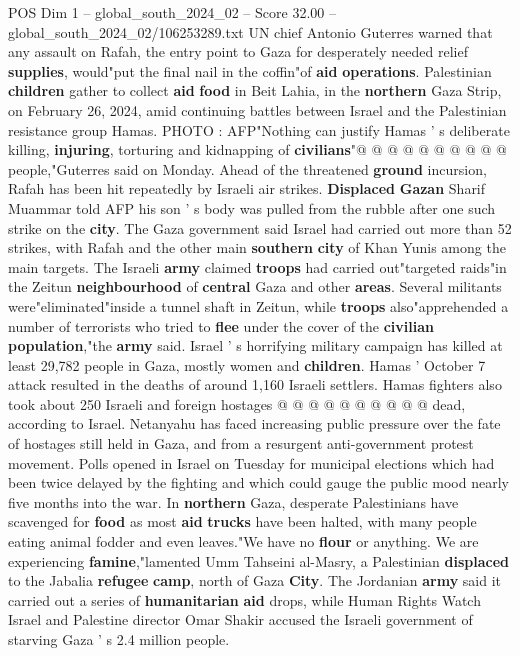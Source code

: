 \begin{textsample}{POS Dim 1 – global\_south\_2024\_02 – Score 32.00 – global\_south\_2024\_02/106253289.txt}
UN chief Antonio Guterres warned that any assault on Rafah, the entry point to Gaza for desperately needed relief \textbf{supplies}, would"put the final nail in the coffin"of \textbf{aid} \textbf{operations}.
Palestinian \textbf{children} gather to collect \textbf{aid} \textbf{food} in Beit Lahia, in the \textbf{northern} Gaza Strip, on February 26, 2024, amid continuing battles between Israel and the Palestinian resistance group Hamas.
PHOTO : AFP"Nothing can justify Hamas ' s deliberate killing, \textbf{injuring}, torturing and kidnapping of \textbf{civilians}"@ @ @ @ @ @ @ @ @ @ people,"Guterres said on Monday.
Ahead of the threatened \textbf{ground} incursion, Rafah has been hit repeatedly by Israeli air strikes. \textbf{Displaced} \textbf{Gazan} Sharif Muammar told AFP his son ' s body was pulled from the rubble after one such strike on the \textbf{city}.
The Gaza government said Israel had carried out more than 52 strikes, with Rafah and the other main \textbf{southern} \textbf{city} of Khan Yunis among the main targets.
The Israeli \textbf{army} claimed \textbf{troops} had carried out"targeted raids"in the Zeitun \textbf{neighbourhood} of \textbf{central} Gaza and other \textbf{areas}.
Several militants were"eliminated"inside a tunnel shaft in Zeitun, while \textbf{troops} also"apprehended a number of terrorists who tried to \textbf{flee} under the cover of the \textbf{civilian} \textbf{population},"the \textbf{army} said.
Israel ' s horrifying military campaign has killed at least 29,782 people in Gaza, mostly women and \textbf{children}.
Hamas ' October 7 attack resulted in the deaths of around 1,160 Israeli settlers.
Hamas fighters also took about 250 Israeli and foreign hostages @ @ @ @ @ @ @ @ @ @ dead, according to Israel.
Netanyahu has faced increasing public pressure over the fate of hostages still held in Gaza, and from a resurgent anti-government protest movement.
Polls opened in Israel on Tuesday for municipal elections which had been twice delayed by the fighting and which could gauge the public mood nearly five months into the war.
In \textbf{northern} Gaza, desperate Palestinians have scavenged for \textbf{food} as most \textbf{aid} \textbf{trucks} have been halted, with many people eating animal fodder and even leaves."We have no \textbf{flour} or anything.
We are experiencing \textbf{famine},"lamented Umm Tahseini al-Masry, a Palestinian \textbf{displaced} to the Jabalia \textbf{refugee} \textbf{camp}, north of Gaza \textbf{City}.
The Jordanian \textbf{army} said it carried out a series of \textbf{humanitarian} \textbf{aid} drops, while Human Rights Watch Israel and Palestine director Omar Shakir accused the Israeli government of starving Gaza ' s 2.4 million people.

\end{textsample}
